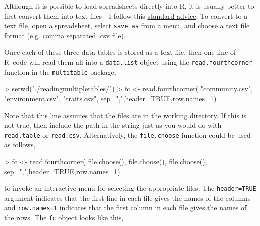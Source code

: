\documentclass{article}
\newcommand{\R}{{\sf R}}
\newcommand{\code}[1]{\texttt{#1}}
\numberwithin{exercise}{section}
\begin{document}
Although it is possible to load spreadsheets directly into \R, it is usually better to first convert them into text files---I follow this \href{http://cran.r-project.org/doc/manuals/R-data.html#Reading-Excel-spreadsheets}{standard advice}.  To convert to a text file, open a spreadsheet, select \code{save as} from a menu, and choose a text file format (e.g. comma separated .csv file).

Once each of these three data tables is stored as a text file, then one line of \R\ code will read them all into a \code{data.list} object using the \code{read.fourthcorner} function in the \code{multitable} package,
\begin{Schunk}
\begin{Sinput}
> setwd("./readingmultipletables/")
> fc <- read.fourthcorner(
   "community.csv",
   "environment.csv",
   "traits.csv",
   sep=",",header=TRUE,row.names=1)
\end{Sinput}
\end{Schunk}
Note that this line assumes that the files are in the working directory.  If this is not true, then include the path in the string just as you would do with \code{read.table} or \code{read.csv}.  Alternatively, the \code{file.choose} function could be used as follows,
\begin{Schunk}
\begin{Sinput}
> fc <- read.fourthcorner(
   file.choose(),
   file.choose(),
   file.choose(),
   sep=",",header=TRUE,row.names=1)
\end{Sinput}
\end{Schunk}
to invoke an interactive menu for selecting the appropriate files.  The \code{header=TRUE} argument indicates that the first line in each file gives the names of the columns and \code{row.names=1} indicates that the first column in each file gives the names of the rows.  The \code{fc} object looks like this,
\end{document}
